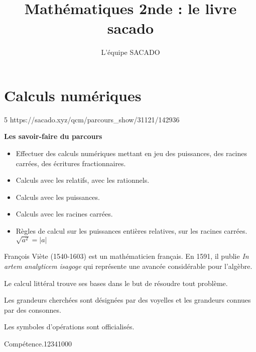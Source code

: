 



\title{Mathématiques 2nde  : le livre sacado}
\author{L'équipe SACADO}

\parindent=0pt



\chapter{Calculs numériques}{5}
{https://sacado.xyz/qcm/parcours_show/31121/142936}
{
 \begin{CpsCol}
	\textbf{Les savoir-faire du parcours}
 	\begin{itemize}
 
		\item Effectuer des calculs numériques mettant en jeu des puissances, des racines carrées, des écritures fractionnaires.
		\item Calculs avec les relatifs, avec les rationnels.
		\item Calculs avec les puissances.
		\item Calculs avec les racines carrées.
		\item Règles de calcul sur les puissances entières relatives, sur les racines carrées. $\sqrt {a^2} = |a|$ 
 
 	\end{itemize}
 \end{CpsCol}

\begin{His}
François Viète (1540-1603) est un mathématicien français. En 1591, il publie \textit{In artem analyticem isagoge} qui représente une avancée considérable pour l'algèbre.

Le calcul littéral trouve ses bases dans le but de résoudre tout problème.

Les grandeurs cherchées sont désignées par des voyelles et les grandeurs connues par des consonnes.

Les symboles d'opérations sont officialisés.
\end{His}

\begin{ExoDec}{Compétence.}{1234}{1}{0}{0}{0}
\end{ExoDec}
}

